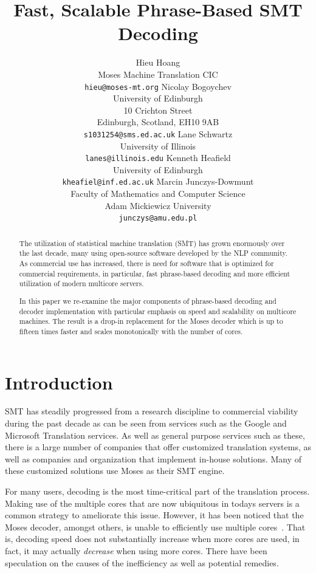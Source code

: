 \documentclass[11pt]{article}
\title{Fast, Scalable Phrase-Based SMT Decoding}
\author{Hieu Hoang\\
	    Moses Machine Translation CIC\\
	    {\tt hieu@moses-mt.org}
	  \And
	Nicolay Bogoychev\\
  	University of Edinburgh\\
  	10 Crichton Street\\
  	Edinburgh, Scotland, EH10 9AB\\
  {\tt s1031254@sms.ed.ac.uk}
	  \And
	Lane Schwartz\\
  	University of Illinois\\
  {\tt lanes@illinois.edu}
	  \AND
	Kenneth Heafield\\
  	University of Edinburgh\\
  {\tt kheafiel@inf.ed.ac.uk}
	  \And
	Marcin Junczys-Dowmunt\\
	Faculty of Mathematics and Computer Science \\
	Adam Mickiewicz University\\
  {\tt junczys@amu.edu.pl}
	}
\date{}
\begin{document}
\maketitle

\begin{abstract}
The utilization of statistical machine translation (SMT) has grown enormously over the last decade, many using open-source software developed by the NLP community. As commercial use has increased, there is need for  software that is optimized for commercial requirements, in particular, fast phrase-based decoding and more efficient utilization of modern multicore servers.

In this paper we re-examine the major components of phrase-based decoding and decoder implementation with particular emphasis on speed and scalability on multicore machines. The result is a drop-in replacement for the Moses decoder which is up to fifteen times faster and scales monotonically with the number of cores. 

\end{abstract}

\section{Introduction}

SMT has steadily progressed from a research discipline to commercial viability during the past decade as can be seen from services such as the Google and Microsoft Translation services. As well as general purpose services such as these, there is a large number of companies that offer customized translation systems, as well as  companies and organization that implement in-house solutions. Many of these customized solutions use Moses as their SMT engine.

For many users, decoding is the most time-critical part of the translation process. Making use of the multiple cores that are now ubiquitous in todays servers is a common strategy to ameliorate this issue. However, it has been noticed that the Moses decoder, amongst others, is unable to efficiently use multiple cores~\cite{mfernandez2016boosting}. That is, decoding speed does not substantially increase when more cores are used, in fact, it may actually \emph{decrease} when using more cores. There have been speculation on the causes of the inefficiency as well as potential remedies. 
\end{document}
